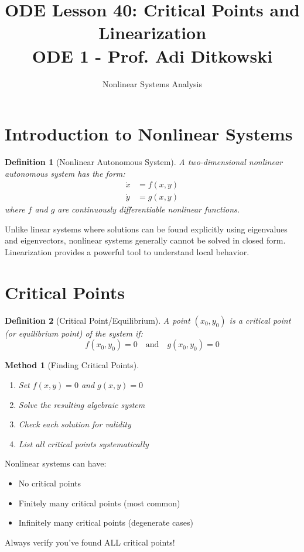 \documentclass[12pt]{article}
\title{ODE Lesson 40: Critical Points and Linearization\\
\large ODE 1 - Prof. Adi Ditkowski}
\author{Nonlinear Systems Analysis}
\date{}
\newtheorem{definition}{Definition}
\newtheorem{method}{Method}
\begin{document}
\maketitle

\section{Introduction to Nonlinear Systems}

\begin{definition}[Nonlinear Autonomous System]
A two-dimensional nonlinear autonomous system has the form:
\begin{align}
\dot{x} &= f(x,y) \\
\dot{y} &= g(x,y)
\end{align}
where $f$ and $g$ are continuously differentiable nonlinear functions.
\end{definition}

\begin{keypoint}
Unlike linear systems where solutions can be found explicitly using eigenvalues and eigenvectors, nonlinear systems generally cannot be solved in closed form. Linearization provides a powerful tool to understand local behavior.
\end{keypoint}

\section{Critical Points}

\begin{definition}[Critical Point/Equilibrium]
A point $(x_0, y_0)$ is a critical point (or equilibrium point) of the system if:
$$f(x_0, y_0) = 0 \quad \text{and} \quad g(x_0, y_0) = 0$$
\end{definition}

\begin{method}[Finding Critical Points]
\begin{enumerate}
    \item Set $f(x,y) = 0$ and $g(x,y) = 0$
    \item Solve the resulting algebraic system
    \item Check each solution for validity
    \item List all critical points systematically
\end{enumerate}
\end{method}

\begin{warning}
Nonlinear systems can have:
\begin{itemize}
    \item No critical points
    \item Finitely many critical points (most common)
    \item Infinitely many critical points (degenerate cases)
\end{itemize}
Always verify you've found ALL critical points!
\end{warning}
\end{document}

